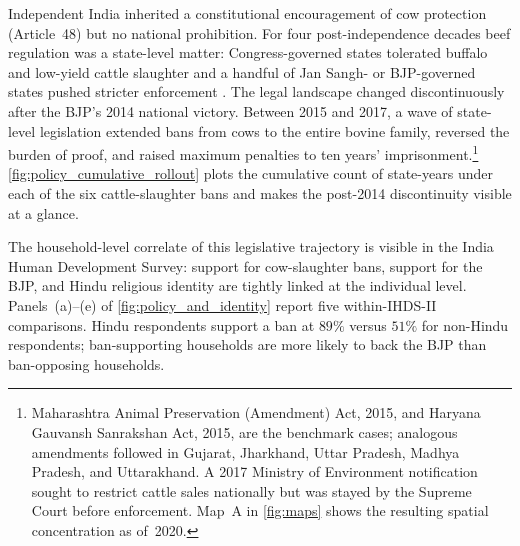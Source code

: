 Independent India inherited a constitutional encouragement of cow protection
(Article~48) but no national prohibition. For four post-independence decades
beef regulation was a state-level matter: Congress-governed states tolerated
buffalo and low-yield cattle slaughter and a handful of Jan Sangh- or
BJP-governed states pushed stricter enforcement \citep*{jaffrelotHinduNationalistMovement1999}. The legal landscape changed
discontinuously after the BJP's 2014 national victory. Between 2015 and
2017, a wave of state-level legislation extended bans from cows to the
entire bovine family, reversed the burden of proof, and raised maximum
penalties to ten years' imprisonment.\footnote{Maharashtra Animal
Preservation (Amendment) Act, 2015, and Haryana Gauvansh Sanrakshan Act,
2015, are the benchmark cases; analogous amendments followed in Gujarat,
Jharkhand, Uttar Pradesh, Madhya Pradesh, and Uttarakhand. A 2017 Ministry
of Environment notification sought to restrict cattle sales nationally but
was stayed by the Supreme Court before enforcement. Map~A in
\autoref{fig:maps} shows the resulting spatial concentration as of~2020.}
\autoref{fig:policy_cumulative_rollout} plots the cumulative count of
state-years under each of the six cattle-slaughter bans and makes the
post-2014 discontinuity visible at a glance.

The household-level correlate of this legislative trajectory is visible in
the India Human Development Survey: support for cow-slaughter bans, support
for the BJP, and Hindu religious identity are tightly linked at the
individual level. Panels~(a)--(e) of \autoref{fig:policy_and_identity}
report five within-IHDS-II comparisons. Hindu respondents support a ban at
$89\%$ versus $51\%$ for non-Hindu respondents; ban-supporting
households are more likely to back the
BJP than ban-opposing households. 


